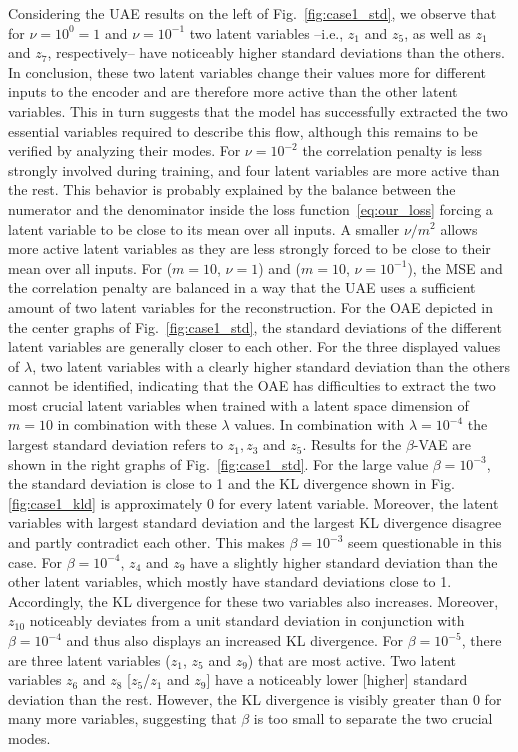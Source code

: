 Considering the UAE results on the left of Fig.~\ref{fig:case1_std}, we observe that for $\nu=10^0=1$ and $\nu=10^{-1}$ two latent variables --i.e., $z_1$ and $z_5$, as well as $z_1$ and $z_7$, respectively-- have  noticeably higher standard deviations than the others. In conclusion, these two latent variables change their values more for different inputs to the encoder and are therefore more active than the other latent variables. This in turn suggests that the model has successfully extracted the two essential variables required to describe this flow, although this remains to be verified by analyzing their modes.
For $\nu=10^{-2}$ the correlation penalty is less strongly involved during training, and four latent variables are more active than the rest. 
This behavior is probably explained by the {balance between the numerator and the denominator} inside the loss function~\eqref{eq:our_loss} forcing a latent variable to be close to its mean over all inputs. A smaller $\nu/m^2$ allows more active latent variables as they are less strongly forced to be close to their mean over all inputs. For ($m=10$, $\nu=1$) and 
($m=10$, $\nu=10^{-1}$), the MSE and the correlation penalty are balanced in a way that the UAE uses a sufficient amount of two latent variables for the reconstruction. 
%
%
For the OAE depicted in the center graphs of Fig.~\ref{fig:case1_std}, the standard deviations of the different latent variables are generally closer to each other. For the three displayed values of $\lambda$, two latent variables with a clearly higher standard deviation than the others cannot be identified, indicating that the OAE has difficulties to extract the two most crucial latent variables when trained with a latent space dimension of $m=10$ in combination with these $\lambda$ values. In combination with $\lambda=10^{-4}$ the largest standard deviation refers to $z_1, z_3$ and $z_5$.  %
%
Results for the $\beta$-VAE are shown in the right graphs of Fig.~\ref{fig:case1_std}. For the large value $\beta=10^{-3}$, the standard deviation is close to 1 and the KL divergence shown in Fig. \ref{fig:case1_kld} is approximately 0 for every latent variable. Moreover, 
 the latent variables with largest standard deviation and the largest KL divergence disagree and partly contradict each other.
This makes  $\beta=10^{-3}$ seem questionable in this case. 
For $\beta=10^{-4}$, $z_4$ and $z_9$ have a slightly higher standard deviation than the other latent variables, which mostly have standard deviations close to 1. Accordingly, the KL divergence for these two variables also increases.
Moreover, $z_{10}$ noticeably deviates from a unit standard deviation in conjunction with $\beta=10^{-4}$ and thus also displays an increased KL divergence. 
For $\beta=10^{-5}$, there are three latent variables {($z_1$, $z_5$ and $z_9$)} that are most active. Two latent variables $z_6$ and $z_8$ [$z_5$/$z_1$ and $z_9$] 
have a noticeably lower [higher] standard deviation than the rest. However, the KL divergence is visibly greater than 0 for many more variables, suggesting that $\beta$ is too small to separate the two crucial modes.

